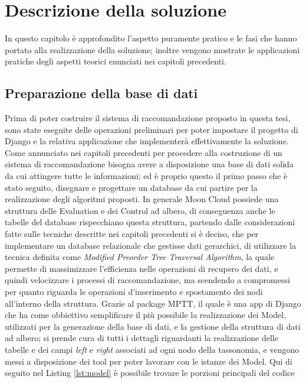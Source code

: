 \chapter{Descrizione della soluzione}\label{chp:04-solution}
In questo capitolo è approfondito l'aspetto puramente pratico e le fasi che hanno portato alla realizzazione della soluzione; 
inoltre vengono mostrate le applicazioni pratiche degli aspetti teorici enunciati nei capitoli precedenti.
\section*{Preparazione della base di dati}
Prima di poter costruire il sistema di raccomandazione proposto in questa tesi, sono state eseguite delle operazioni preliminari 
per poter impostare il progetto di Django e la relativa applicazione che implementerà effettivamente la soluzione.
%
Come annunciato nei capitoli precedenti per procedere alla costruzione di un sistema di raccomandazione bisogna avere a disposizione 
una base di dati solida da cui attingere tutte le informazioni; ed è proprio questo il primo passo che è stato seguito, disegnare 
e progettare un database da cui partire per la realizzazione degli algoritmi proposti.
In generale Moon Cloud possiede una struttura delle Evaluation e dei Control ad albero, di conseguenza anche le tabelle del database 
rispecchiano questa struttura, partendo dalle considerazioni fatte sulle tecniche descritte nei capitoli precedenti si è deciso, che 
per implementare un database relazionale che gestisse dati gerarchici, di utilizzare la tecnica
definita come \textit{Modified Preorder Tree Traversal Algorithm}, la quale permette di massimizzare l'efficienza nelle 
operazioni di recupero dei dati, e quindi velocizzare i processi di raccomandazione, ma scendendo a compromessi per quanto riguarda le 
operazioni d'inserimento e spostamento dei nodi all'interno della struttura. 
Grazie al package MPTT, il quale è una app di Django che ha come obbiettivo semplificare il più possibile la realizzazione dei 
Model, utilizzati per la generazione della base di dati, e la 
gestione della struttura di dati ad albero; si prende cura di tutti i dettagli riguardanti la realizzazione delle tabelle e dei 
campi \textit{left} e \textit{right} associati ad ogni nodo della tassonomia, e vengono messi a disposizione dei tool per poter 
lavorare con le istanze dei Model. Qui di seguito nel Listing \ref{lst:model} è possibile trovare le porzioni principali del codice 
